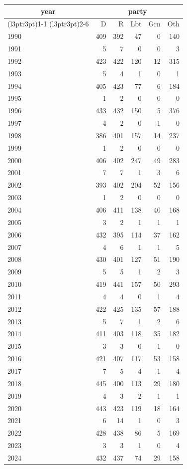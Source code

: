 \footnotesize\begin{tabular}[t]{lrrrrr}
\toprule
\multicolumn{1}{c}{year} & \multicolumn{5}{c}{party} \\
\cmidrule(l{3pt}r{3pt}){1-1} \cmidrule(l{3pt}r{3pt}){2-6}
  & D & R & Lbt & Grn & Oth\\
\midrule
1990 & 409 & 392 & 47 & 0 & 140\\
1991 & 5 & 7 & 0 & 0 & 3\\
1992 & 423 & 422 & 120 & 12 & 315\\
1993 & 5 & 4 & 1 & 0 & 1\\
1994 & 405 & 423 & 77 & 6 & 184\\
1995 & 1 & 2 & 0 & 0 & 0\\
1996 & 433 & 432 & 150 & 5 & 376\\
1997 & 4 & 2 & 0 & 1 & 0\\
1998 & 386 & 401 & 157 & 14 & 237\\
1999 & 1 & 2 & 0 & 0 & 0\\
2000 & 406 & 402 & 247 & 49 & 283\\
2001 & 7 & 7 & 1 & 3 & 6\\
2002 & 393 & 402 & 204 & 52 & 156\\
2003 & 1 & 2 & 0 & 0 & 0\\
2004 & 406 & 411 & 138 & 40 & 168\\
2005 & 3 & 2 & 1 & 1 & 1\\
2006 & 432 & 395 & 114 & 37 & 162\\
2007 & 4 & 6 & 1 & 1 & 5\\
2008 & 430 & 401 & 127 & 51 & 190\\
2009 & 5 & 5 & 1 & 2 & 3\\
2010 & 419 & 441 & 157 & 50 & 293\\
2011 & 4 & 4 & 0 & 1 & 4\\
2012 & 422 & 425 & 135 & 57 & 188\\
2013 & 5 & 7 & 1 & 2 & 6\\
2014 & 411 & 403 & 118 & 35 & 182\\
2015 & 3 & 3 & 0 & 1 & 0\\
2016 & 421 & 407 & 117 & 53 & 158\\
2017 & 7 & 5 & 4 & 1 & 4\\
2018 & 445 & 400 & 113 & 29 & 180\\
2019 & 4 & 3 & 2 & 1 & 1\\
2020 & 443 & 423 & 119 & 18 & 164\\
2021 & 6 & 14 & 1 & 0 & 3\\
2022 & 428 & 438 & 86 & 5 & 169\\
2023 & 3 & 3 & 1 & 0 & 4\\
2024 & 432 & 437 & 74 & 29 & 158\\
\bottomrule
\end{tabular}
